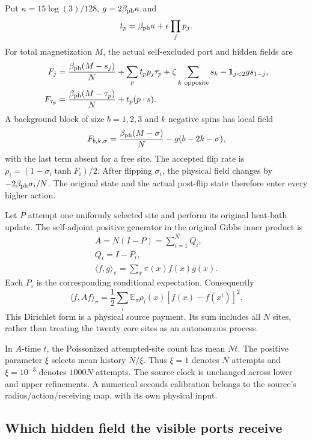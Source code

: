 Put $\kappa=15\log(3)/128$, $g=2\beta_{\rm ph}\kappa$ and
\[
 t_p=\beta_{\rm ph}\kappa+\epsilon\prod_jp_j.
\]
For total magnetization $M$, the actual self-excluded port and hidden fields are
\begin{align*}
 F_j={}&\frac{\beta_{\rm ph}(M-s_j)}N
       +\sum_p t_pp_j\tau_p
       +\zeta\sum_{k\ \mathrm{opposite}}s_k
       -\mathbf1_{j<2}g s_{1-j},\\
 F_{\tau_p}={}&\frac{\beta_{\rm ph}(M-\tau_p)}N+t_p(p\cdot s).
\end{align*}
A background block of size $b=1,2,3$ and $k$ negative spins has local field
\[
 F_{b,k,\sigma}=\frac{\beta_{\rm ph}(M-\sigma)}N
                         -g(b-2k-\sigma),
\]
with the last term absent for a free site. The accepted flip rate is $\rho_i=(1-\sigma_i\tanh F_i)/2$. After flipping $\sigma_i$, the physical field changes by $-2\beta_{\rm ph}\sigma_i/N$. The original state and the actual post-flip state therefore enter every higher action.

Let $P$ attempt one uniformly selected site and perform its original heat-bath update. The self-adjoint positive generator in the original Gibbs inner product is
\[
\begin{gathered}
A=N(I-P)=\sum_{i=1}^NQ_i,
 \\
Q_i=I-P_i,
 \\
\langle f,g\rangle_\pi=\sum_x\pi(x)f(x)g(x).
\end{gathered}
\]
Each $P_i$ is the corresponding conditional expectation. Consequently
\[
 \langle f,Af\rangle_\pi
 =\frac12\sum_i\mathbb E_\pi\rho_i(x)[f(x)-f(x^i)]^2.
\]
This Dirichlet form is a physical source payment. Its sum includes all $N$ sites, rather than treating the twenty core sites as an autonomous process.

In $A$-time $t$, the Poissonized attempted-site count has mean $Nt$. The positive parameter $\xi$ selects mean history $N/\xi$. Thus $\xi=1$ denotes $N$ attempts and $\xi=10^{-3}$ denotes $1000N$ attempts. The source clock is unchanged across lower and upper refinements. A numerical seconds calibration belongs to the source's radius/action/receiving map, with its own physical input.

\subsection{Which hidden field the visible ports receive}

